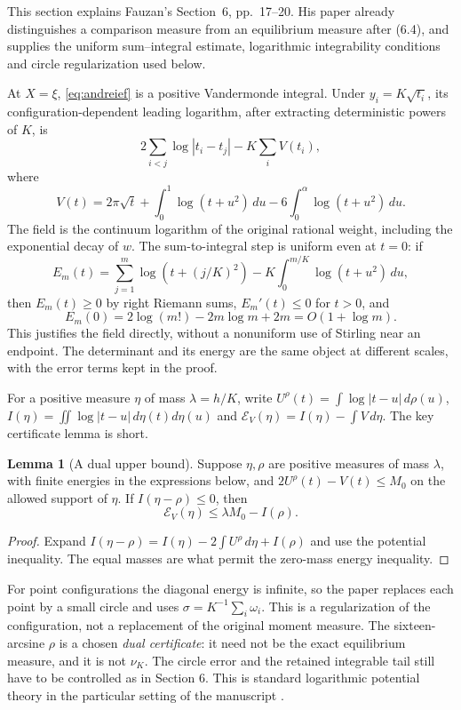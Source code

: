 \documentclass[11pt]{article}
\theoremstyle{definition}
\newtheorem{lemma}[proposition]{Lemma}
\theoremstyle{remark}\newtheorem*{remark}{Remark}
\newcommand{\dd}{\,d}
\begin{document}
This section explains Fauzan's Section~6, pp.~17--20. His paper already
distinguishes a comparison measure from an equilibrium measure after (6.4),
and supplies the uniform sum--integral estimate, logarithmic integrability
conditions and circle regularization used below.

At $X=\xi$, \eqref{eq:andreief} is a positive Vandermonde integral. Under
$y_i=K\sqrt{t_i}$, its configuration-dependent leading logarithm, after
extracting deterministic powers of $K$, is
\begin{equation}\label{eq:discreteenergy}
 2\sum_{i<j}\log|t_i-t_j|-K\sum_iV(t_i),
\end{equation}
where
\[
 V(t)=2\pi\sqrt t+\int_0^1\log(t+u^2)\dd u
                   -6\int_0^\alpha\log(t+u^2)\dd u.
\]
The field is the continuum logarithm of the original rational weight, including
the exponential decay of $w$. The sum-to-integral step is uniform even at $t=0$:
if
\[
 E_m(t)=\sum_{j=1}^m\log(t+(j/K)^2)
       -K\int_0^{m/K}\log(t+u^2)\dd u,
\]
then $E_m(t)\ge0$ by right Riemann sums, $E_m'(t)\le0$ for $t>0$, and
\[
 E_m(0)=2\log(m!)-2m\log m+2m=O(1+\log m).
\]
This justifies the field directly, without a nonuniform use of Stirling near an
endpoint. The determinant and its energy are the same object at different
scales, with the error terms kept in the proof.

For a positive measure $\eta$ of mass $\lambda=h/K$, write
$U^\rho(t)=\int\log|t-u|\,d\rho(u)$,
$I(\eta)=\iint\log|t-u|\,d\eta(t)d\eta(u)$ and
$\mathcal E_V(\eta)=I(\eta)-\int V\,d\eta$.
The key certificate lemma is short.
\begin{lemma}[A dual upper bound]\label{lem:energy}
Suppose $\eta,\rho$ are positive measures of mass $\lambda$, with finite energies
in the expressions below, and
$2U^\rho(t)-V(t)\le M_0$ on the allowed support of $\eta$.
If $I(\eta-\rho)\le0$, then
\[
 \mathcal E_V(\eta)\le\lambda M_0-I(\rho).
\]
\end{lemma}
\begin{proof}
Expand
$I(\eta-\rho)=I(\eta)-2\int U^\rho\,d\eta+I(\rho)$ and use the potential
inequality. The equal masses are what permit the zero-mass energy inequality.
\end{proof}
For point configurations the diagonal energy is infinite, so the paper replaces
each point by a small circle and uses
$\sigma=K^{-1}\sum_i\omega_i$. This is a regularization of the configuration,
not a replacement of the original moment measure. The sixteen-arcsine $\rho$
is a chosen \emph{dual certificate}: it need not be the exact equilibrium
measure, and it is not $\nu_K$. The circle error and the retained integrable
tail still have to be controlled as in Section 6. This is standard logarithmic
potential theory in the particular setting of the manuscript \cite{Saff}.
\end{document}
